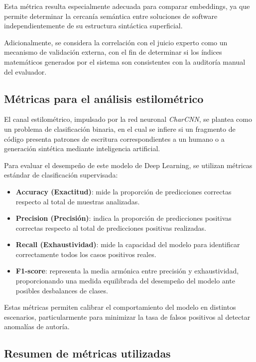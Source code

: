 Esta métrica resulta especialmente adecuada para comparar embeddings, ya que permite determinar la cercanía semántica entre soluciones de software independientemente de su estructura sintáctica superficial.

Adicionalmente, se considera la correlación con el juicio experto como un mecanismo de validación externa, con el fin de determinar si los índices matemáticos generados por el sistema son consistentes con la auditoría manual del evaluador.

\subsection{Métricas para el análisis estilométrico}

El canal estilométrico, impulsado por la red neuronal \textit{CharCNN}, se plantea como un problema de clasificación binaria, en el cual se infiere si un fragmento de código presenta patrones de escritura correspondientes a un humano o a generación sintética mediante inteligencia artificial.

Para evaluar el desempeño de este modelo de Deep Learning, se utilizan métricas estándar de clasificación supervisada:

\begin{itemize}
	\item \textbf{Accuracy (Exactitud)}: mide la proporción de predicciones correctas respecto al total de muestras analizadas.
	\item \textbf{Precision (Precisión)}: indica la proporción de predicciones positivas correctas respecto al total de predicciones positivas realizadas.
	\item \textbf{Recall (Exhaustividad)}: mide la capacidad del modelo para identificar correctamente todos los casos positivos reales.
	\item \textbf{F1-score}: representa la media armónica entre precisión y exhaustividad, proporcionando una medida equilibrada del desempeño del modelo ante posibles desbalances de clases.
\end{itemize}

Estas métricas permiten calibrar el comportamiento del modelo en distintos escenarios, particularmente para minimizar la tasa de falsos positivos al detectar anomalías de autoría.

\subsection{Resumen de métricas utilizadas}

